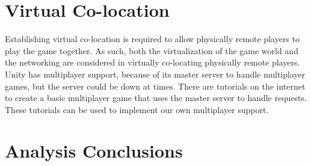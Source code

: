 	\section{Virtual Co-location} \label{sec:virtualcolocation}
		Establishing virtual co-location is required to allow physically remote players
		to play the game together. As such, both the virtualization of the game world and
		the networking are considered in virtually co-locating physically remote players.
		Unity has multiplayer support, because of its master server to handle multiplayer
		games, but the server could be down at times. There are tutorials on the internet
		to create a basic multiplayer game that uses the master server to handle requests.
		These tutorials can be used to implement our own multiplayer support.
		
	\section{Analysis Conclusions} \label{sec:analysisconclusion}
